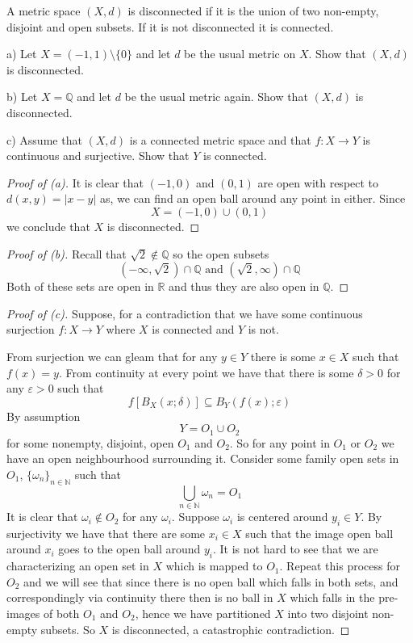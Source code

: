 \begin{prob}[3.3.13 Spaces]
    A metric space $(X,d)$ is disconnected if it is the union 
    of two non-empty, disjoint and open subsets. If it is not 
    disconnected it is connected. 
    
    a) Let $X = (-1,1) \setminus \{0\}$ and let $d$ be the usual 
    metric on $X$. Show that $(X,d)$ is disconnected. 

    b) Let $X = \mathbb Q$ and let $d$ be the usual metric again. 
    Show that $(X,d)$ is disconnected. 

    c) Assume that $(X,d)$ is a connected metric space
    and that $f: X \to Y$ is continuous and surjective. Show that 
    $Y$ is connected.
\end{prob}
\begin{proof}[Proof of (a)]
    It is clear that $(-1,0)$ and $(0,1)$ are open with respect to 
    $d(x,y) = |x-y|$ as, we can find an open ball around any 
    point in either. Since 
    \[
        X = (-1,0) \cup (0,1)
    \]
    we conclude that $X$ is disconnected. 
\end{proof}
\begin{proof}[Proof of (b)]
    Recall that $\sqrt 2 \not\in \mathbb Q$ so 
    the open subsets 
    \[
        (-\infty, \sqrt 2) \cap \mathbb Q 
        \text{ and }
        (\sqrt 2, \infty) \cap \mathbb Q 
    \]
    Both of these sets are open in $\mathbb R$ and thus they 
    are also open in $\mathbb Q$.
\end{proof}
\begin{proof}[Proof of (c)]
    Suppose, for a contradiction that we have some 
    continuous surjection $f : X \to Y$ where $X$ is connected 
    and $Y$ is not. 

    From surjection we can gleam that for any $y \in Y$ there 
    is some $x \in X$ such that $f(x) = y$. From continuity
    at every point we have that there is some 
    $\delta > 0$ for any $\varepsilon > 0$ such that
    \[
        f\left[B_X(x;\delta)\right] \subseteq B_Y(f(x);\varepsilon)
    \]
    By assumption 
    \[
        Y = O_1 \cup O_2
    \]
    for some nonempty, disjoint, open $O_1$ and $O_2$.  
    So for any point in $O_1$ or $O_2$ we have an open neighbourhood 
    surrounding it. Consider some family open sets in 
    $O_1$, $\{\omega_n\}_{n\in\mathbb N}$ such that 
    \[
        \bigcup_{n\in\mathbb N} \omega_n = O_1
    \]
    It is clear that $\omega_i \not \in O_2$ for any $\omega_i$. 
    Suppose $\omega_i$ is centered around $y_i \in Y$. By surjectivity
    we have that there are some $x_i \in X$ such that 
    the image open ball around $x_i$ goes to the open ball around 
    $y_i$. It is not hard to see that we are characterizing 
    an open set in $X$ which is mapped to $O_1$. Repeat this process 
    for $O_2$ and we will see that since there is no open ball 
    which falls in both sets, and correspondingly via 
    continuity there then is no ball in $X$ which falls in the 
    pre-images of both $O_1$ and $O_2$, hence we have partitioned 
    $X$ into two disjoint non-empty subsets. So $X$ is disconnected, 
    a catastrophic contradiction.
\end{proof}
